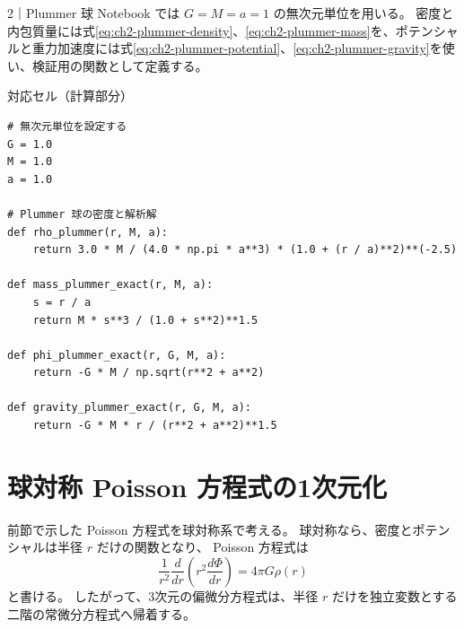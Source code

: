 \begin{notebookblock}{2｜Plummer 球}
Notebook では $G=M=a=1$ の無次元単位を用いる。
密度と内包質量には式\eqref{eq:ch2-plummer-density}、\eqref{eq:ch2-plummer-mass}を、ポテンシャルと重力加速度には式\eqref{eq:ch2-plummer-potential}、\eqref{eq:ch2-plummer-gravity}を使い、検証用の関数として定義する。

{\sffamily\small\color{graytext}対応セル（計算部分）}
\begin{Verbatim}[xleftmargin=2mm,fontsize=\small,frame=single,framesep=1.8mm,framerule=0.35pt,rulecolor=\color{listingframe},fillcolor=\color{listingbg}]
# 無次元単位を設定する
G = 1.0
M = 1.0
a = 1.0

# Plummer 球の密度と解析解
def rho_plummer(r, M, a):
    return 3.0 * M / (4.0 * np.pi * a**3) * (1.0 + (r / a)**2)**(-2.5)

def mass_plummer_exact(r, M, a):
    s = r / a
    return M * s**3 / (1.0 + s**2)**1.5

def phi_plummer_exact(r, G, M, a):
    return -G * M / np.sqrt(r**2 + a**2)

def gravity_plummer_exact(r, G, M, a):
    return -G * M * r / (r**2 + a**2)**1.5
\end{Verbatim}
\end{notebookblock}

\section{球対称 Poisson 方程式の1次元化}
\label{sec:ch2-spherical-poisson}

前節で示した Poisson 方程式を球対称系で考える。
球対称なら、密度とポテンシャルは半径 $r$ だけの関数となり、
Poisson 方程式は
\begin{equation}
 \frac{1}{r^2}\frac{d}{dr}
 \left(r^2\frac{d\Phi}{dr}\right)
 =4\pi G\rho(r)
\label{eq:ch2-poisson-spherical}
\end{equation}
と書ける。
したがって、3次元の偏微分方程式は、半径 $r$ だけを独立変数とする二階の常微分方程式へ帰着する。

